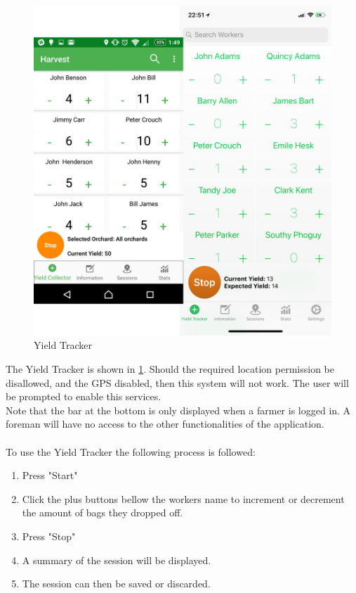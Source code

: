 \documentclass[11pt]{article}
\begin{document}
\begin{figure}
 \centering
 \includegraphics[width=12cm, keepaspectratio]{Images/mobileClicker.png}
 \caption{Yield Tracker}
 \label{Yield Tracker}
\end{figure}

The Yield Tracker is shown in \ref{Yield Tracker}. Should the required location permission be disallowed, and the GPS disabled, then this system will not work. The user will be prompted to enable this services.\\
Note that the bar at the bottom is only displayed when a farmer is logged in. A foreman will have no access to the other functionalities of the application.\\
\\
To use the Yield Tracker the following process is followed:
\begin{enumerate}
\item Press "Start"
\item Click the plus buttons bellow the workers name to increment or decrement the amount of bags they dropped off.
\item Press "Stop"
\item A summary of the session will be displayed.
\item The session can then be saved or discarded.
\end{enumerate}
\end{document}
